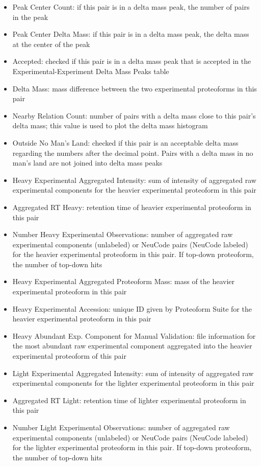 \begin{itemize}
\begin{itemize}
	\item Peak Center Count: if this pair is in a delta mass peak, the number of pairs in the peak
	\item Peak Center Delta Mass: if this pair is in a delta mass peak, the delta mass at the center of the peak
	\item Accepted: checked if this pair is in a delta mass peak that is accepted in the Experimental-Experiment Delta Mass Peaks table
	\item Delta Mass: mass difference between the two experimental proteoforms in this pair
	\item Nearby Relation Count: number of pairs with a delta mass close to this pair's delta mass; this value is used to plot the delta mass histogram
	\item Outside No Man's Land: checked if this pair is an acceptable delta mass regarding the numbers after the decimal point. Pairs with a delta mass in no man's land are not joined into delta mass peaks
	\item Heavy Experimental Aggregated Intensity: sum of intensity of aggregated raw experimental components for the heavier experimental proteoform in this pair
	\item Aggregated RT Heavy: retention time of heavier experimental proteoform in this pair
	\item Number Heavy Experimental Observations: number of aggregated raw experimental components (unlabeled) or NeuCode pairs (NeuCode labeled) for the heavier experimental proteoform in this pair. If top-down proteoform, the number of top-down hits
	\item Heavy Experimental Aggregated Proteoform Mass: mass of the heavier experimental proteoform in this pair
	\item Heavy Experimental Accession: unique ID given by Proteoform Suite for the heavier experimental proteoform in this pair		
	\item Heavy Abundant Exp. Component for Manual Validation: file information for the most abundant raw experimental component aggregated into the heavier experimental proteoform of this pair
	\item Light Experimental Aggregated Intensity: sum of intensity of aggregated raw experimental components for the lighter experimental proteoform in this pair
	\item Aggregated RT Light: retention time of lighter experimental proteoform in this pair
	\item Number Light Experimental Observations: number of aggregated raw experimental components (unlabeled) or NeuCode pairs (NeuCode labeled) for the lighter experimental proteoform in this pair. If top-down proteoform, the number of top-down hits

\end{itemize}
\end{itemize}
